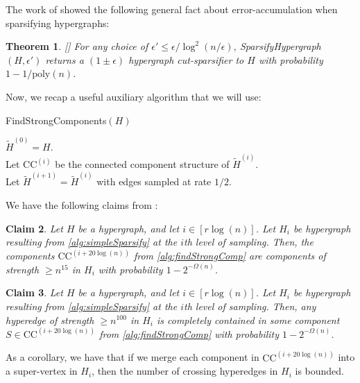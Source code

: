 \documentclass[11pt]{article}
\newtheorem{theorem}{Theorem}[section]
\newtheorem{claim}[theorem]{Claim}
\theoremstyle{definition}
\newcommand{\eps}{\epsilon}
\begin{document}
The work of \cite{KPS24d} showed the following general fact about error-accumulation when sparsifying hypergraphs:

\begin{theorem}\label{thm:kpsaccuracy}[\cite{KPS24d}]
	For any choice of $\eps' \leq \eps / \log^2(n / \eps)$, SparsifyHypergraph$(H, \eps')$ returns a $(1 \pm \eps)$ hypergraph cut-sparsifier to $H$ with probability $1 - 1 / \mathrm{poly}(n)$. 
	\end{theorem}
	
Now, we recap a useful auxiliary algorithm that we will use:

\begin{algorithm}[H]
	\caption{FindStrongComponents$(H)$}\label{alg:findStrongComp}
	$\widetilde{H}^{(0)} = H$. \\
	{
		Let $\mathrm{CC}^{(i)}$ be the connected component structure of $\widetilde{H}^{(i)}$. \\
		Let $\widetilde{H}^{(i+1)} = \widetilde{H}^{(i)}$ with edges sampled at rate $1/2$. \\
	}
\end{algorithm}

We have the following claims from \cite{KPS24d}:

\begin{claim}\label{clm:subsamplingGivesStrong}
	Let $H$ be a hypergraph, and let $i \in [r \log(n)]$. Let $H_i$ be hypergraph resulting from \cref{alg:simpleSparsify} at the $i$th level of sampling. Then, the components $\mathrm{CC}^{(i + 20 \log(n))}$ from \cref{alg:findStrongComp} are components of strength $\geq n^{15}$ in  $H_i$ with probability $1 - 2^{-\Omega(n)}$.
\end{claim}

\begin{claim}
	Let $H$ be a hypergraph, and let $i \in [r \log(n)]$. Let $H_i$ be hypergraph resulting from \cref{alg:simpleSparsify} at the $i$th level of sampling. Then, any hyperedge of strength $\geq n^{100}$ in $H_i$ is completely contained in some component $S \in \mathrm{CC}^{(i + 20 \log(n))}$ from \cref{alg:findStrongComp} with probability $1 - 2^{-\Omega(n)}$.
\end{claim}

As a corollary, we have that if we merge each component in  $\mathrm{CC}^{(i + 20 \log(n))}$ into a super-vertex in $H_i$, then the number of crossing hyperedges in $H_i$ is bounded. 
\end{document}
